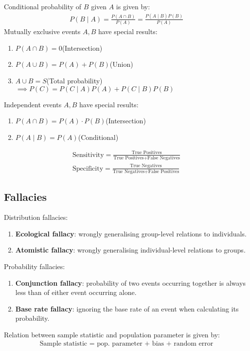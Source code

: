 \documentclass[12pt, a4paper]{article}
\begin{document}
\begin{multicols*}{3}
Conditional probability of $B$ given $A$ is given by:
\begin{align*}
  P(B\mid A) = \displaystyle\frac{P(A\cap B)}{P(A)} = \frac{P(A\mid B)P(B)}{P(A)}
\end{align*}
Mutually exclusive events $A,B$ have special results:
\begin{enumerate}[\roman*.]
  \item $P(A\cap B) = 0$\hfill(Intersection)
  \item $P(A\cup B) = P(A) + P(B)$\hfill(Union)
  \item $A \cup B = S$\hfill(Total probability)\\$\implies P(C) = P(C\mid A)P(A) + P(C\mid B)P(B)$
\end{enumerate}

Independent events $A,B$ have special results:
\begin{enumerate}[\roman*.]
  \item $P(A\cap B) = P(A)\cdot P(B)$\hfill(Intersection)
  \item $P(A\mid B) = P(A)$\hfill(Conditional)
\end{enumerate}
\begin{align*}
  \text{Sensitivity} = \frac{\text{True Positives}}{\text{True Positives} + \text{False Negatives}}\\
  \text{Specificity} = \frac{\text{True Negatives}}{\text{True Negatives} + \text{False Positives}}
\end{align*}

\subsection{Fallacies}
Distribution fallacies:
\begin{enumerate}[\roman*.]
  \item \textbf{Ecological fallacy}: wrongly generalising group-level relations to individuals. 
  \item \textbf{Atomistic fallacy}: wrongly generalising individual-level relations to groups. 
\end{enumerate}

Probability fallacies:
\begin{enumerate}[\roman*.]
  \item \textbf{Conjunction fallacy}: probability of two events occurring together is always less than of either event occurring alone.
  \item \textbf{Base rate fallacy}: ignoring the base rate of an event when calculating its probability.
\end{enumerate}
\colbreak
Relation between sample statistic and population parameter is given by:
\begin{align*}
  \text{Sample statistic = pop. parameter + bias + random error}
\end{align*}


\end{multicols*}
\end{document}

